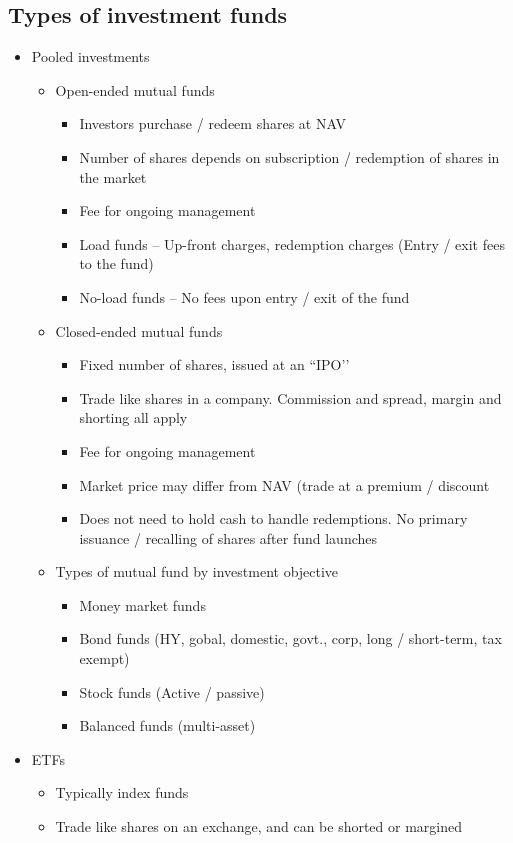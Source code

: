 \documentclass[../notes_compiled.tex]{subfiles}
\begin{document}
\subsection{Types of investment funds}
\begin{itemize}
\item Pooled investments
\begin{itemize}
\item Open-ended mutual funds
\begin{itemize}
\item Investors purchase / redeem shares at NAV
\item Number of shares depends on subscription / redemption of shares in the market
\item Fee for ongoing management
\item Load funds -- Up-front charges, redemption charges (Entry / exit fees to the fund)
\item No-load funds -- No fees upon entry / exit of the fund
\end{itemize}
\item Closed-ended mutual funds
\begin{itemize}
\item Fixed number of shares, issued at an ``IPO’’
\item Trade like shares in a company. Commission and spread, margin and shorting all apply
\item Fee for ongoing management
\item Market price may differ from NAV (trade at a premium / discount
\item Does not need to hold cash to handle redemptions. No primary issuance / recalling of shares after fund launches
\end{itemize}
\item Types of mutual fund by investment objective
\begin{itemize}
\item Money market funds
\item Bond funds (HY, gobal, domestic, govt., corp, long / short-term, tax exempt)
\item Stock funds (Active / passive)
\item Balanced funds (multi-asset)
\end{itemize}
\end{itemize}
\item ETFs
\begin{itemize}
\item Typically index funds
\item Trade like shares on an exchange, and can be shorted or margined

\end{itemize}
\end{itemize}
\end{document}
